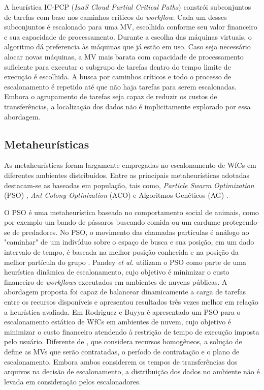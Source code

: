 A heurística IC-PCP (\textit{IaaS Cloud Partial Critical Paths}) \cite{Abrishami} constrói subconjuntos de tarefas com base nos caminhos críticos do \textit{workflow}. Cada um desses subconjuntos é escalonado para uma MV, escolhida conforme seu valor financeiro e sua capacidade de processamento. Durante a escolha das máquinas virtuais, o algoritmo dá preferencia às máquinas que já estão em uso. Caso seja necessário alocar novas máquinas, a MV mais barata com capacidade de processamento suficiente para executar o subgrupo de tarefas dentro do tempo limite de execução é escolhida. A busca por caminhos críticos e todo o processo de escalonamento é repetido até que não haja tarefas para serem escalonadas. Embora o agrupamento de tarefas seja capaz de reduzir os custos de transferências, a localização dos dados não é implicitamente explorado por essa abordagem.


\subsection{Metaheurísticas}

As metaheurísticas foram largamente empregadas no escalonamento de WfCs em diferentes ambientes distribuídos. Entre as principais metaheurísticas adotadas destacam-se as baseadas em população, tais como, \textit{Particle Swarm Optimization} (PSO) \cite{kennedy95}, \textit{Ant Colony Optinization} (ACO) \cite{dorigo99} e Algoritmos Genéticos (AG) \cite{goldberg1989}.

O PSO é uma metaheurística baseada no comportamento social de animais, como por exemplo um bando de pássaros buscando comida ou um cardume protegendo-se de predadores. No PSO, o movimento das chamadas partículas é análogo ao "caminhar" de um indivíduo sobre o espaço de busca e sua posição, em um dado intervalo de tempo, é baseada na melhor posição conhecida e na posição da melhor partícula do grupo \cite{pandey2010}. Pandey \textit{et al.} \cite{pandey2010} utilizam o PSO como parte de uma heurística dinâmica de escalonamento, cujo objetivo é minimizar o custo financeiro de \textit{workflows} executados em ambientes de nuvens públicas. A abordagem proposta foi capaz de balancear dinamicamente a carga de tarefas entre os recursos disponíveis e apresentou resultados três vezes melhor em relação a heurística avaliada. Em Rodriguez e Buyya \cite{Rodriguez2014} é apresentado um PSO para o escalonamento estático de WfCs em ambientes de nuvem, cujo objetivo é minimizar o custo financeiro atendendo à restrição de tempo de execução imposta pelo usuário. Diferente de \cite{pandey2010}, que considera recursos homogêneos, a solução de \cite{Rodriguez2014} define as MVs que serão contratadas, o período de contratação e o plano de escalonamento. Embora ambos considerem os tempos de transferências dos arquivos na decisão de escalonamento, a distribuição dos dados no ambiente não é levada em consideração pelos escalonadores.



